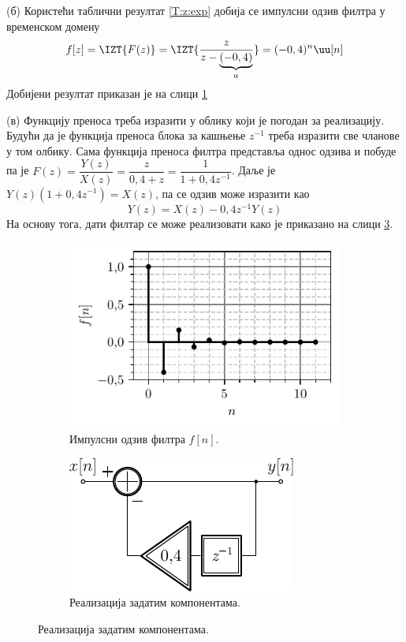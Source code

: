 (б) Користећи таблични резултат \ref{T:z:exp} добија се импулсни одзив филтра у временском домену
\begin{eqnarray}
    f[z] = \IZT{F(z)} = \IZT{\dfrac{z}{z-\underbrace{(-0,4)}_a} } = (-0,4)^n \uu[n]
\end{eqnarray}
Добијени резултат приказан је на слици \ref{fig:\ID.1}

(в) Функцију преноса треба изразити у облику који је погодан за реализацију. Будући да је функција преноса блока за кашњење
$z^{-1}$ треба изразити све чланове у том олбику.
Сама функција преноса филтра представља однос одзива и побуде па је $F(z) = \dfrac{Y(z)}{X(z)} = \dfrac{z}{0,4 + z} = 
\dfrac{1}{1 + 0,4 z^{-1}}$. Даље је $Y(z) (1 + 0,4 z^{-1}) = X(z)$, па се одзив може изразити као 
\begin{equation}
    Y(z) = X(z) - 0,4 z^{-1} Y(z)
\end{equation}
На основу тога, дати филтар се може реализовати како је приказано на слици \ref{fig:\ID.2}.

\begin{figure}[ht!]
\centering
    \begin{subfigure}{0.59\textwidth}
        \centering
        \includegraphics{fig/h_equalizer.pdf}
        \caption{Импулсни одзив филтра $f[n]$.}
        \label{fig:\ID.1}
    \end{subfigure}
    \begin{subfigure}{0.39\textwidth}
        \centering
        \includegraphics{fig/equalizer_blok.pdf}
        \caption{Реализација задатим компонентама.}
        \label{fig:\ID.2}
    \end{subfigure}
\end{figure}